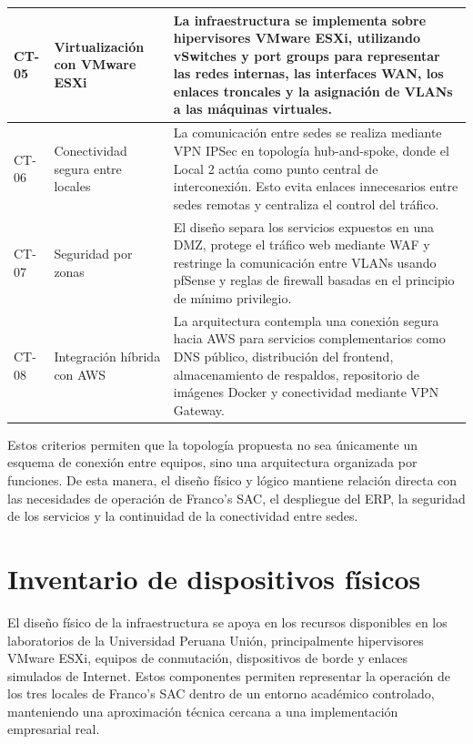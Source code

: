 \documentclass[11pt, a4paper, oneside]{report}
\begin{document}
\begin{xltabular}{\textwidth}{@{}|C{1.5cm}|L{3.5cm}|X|@{}}
    {\small CT-05} & 
    {\small Virtualización con VMware ESXi} & 
    {\small La infraestructura se implementa sobre hipervisores VMware ESXi, utilizando vSwitches y port groups para representar las redes internas, las interfaces WAN, los enlaces troncales y la asignación de VLANs a las máquinas virtuales.} \\ \hline 
    
    {\small CT-06} & 
    {\small Conectividad segura entre locales} & 
    {\small La comunicación entre sedes se realiza mediante VPN IPSec en topología hub-and-spoke, donde el Local 2 actúa como punto central de interconexión. Esto evita enlaces innecesarios entre sedes remotas y centraliza el control del tráfico.} \\ \hline 
    
    {\small CT-07} & 
    {\small Seguridad por zonas} & 
    {\small El diseño separa los servicios expuestos en una DMZ, protege el tráfico web mediante WAF y restringe la comunicación entre VLANs usando pfSense y reglas de firewall basadas en el principio de mínimo privilegio.} \\ \hline 
    
    {\small CT-08} & 
    {\small Integración híbrida con AWS} & 
    {\small La arquitectura contempla una conexión segura hacia AWS para servicios complementarios como DNS público, distribución del frontend, almacenamiento de respaldos, repositorio de imágenes Docker y conectividad mediante VPN Gateway.} \\ \hline 
    
  \end{xltabular}

\normalsize 

Estos criterios permiten que la topología propuesta no sea únicamente un esquema de conexión entre equipos, sino una arquitectura organizada por funciones. De esta manera, el diseño físico y lógico mantiene relación directa con las necesidades de operación de Franco's SAC, el despliegue del ERP, la seguridad de los servicios y la continuidad de la conectividad entre sedes.

\section{Inventario de dispositivos físicos}

El diseño físico de la infraestructura se apoya en los recursos disponibles en los laboratorios de la Universidad Peruana Unión, principalmente hipervisores VMware ESXi, equipos de conmutación, dispositivos de borde y enlaces simulados de Internet. Estos componentes permiten representar la operación de los tres locales de Franco's SAC dentro de un entorno académico controlado, manteniendo una aproximación técnica cercana a una implementación empresarial real.
\end{document}

